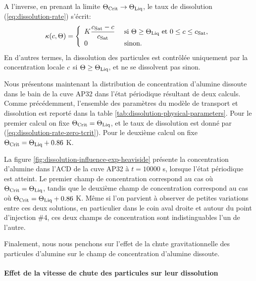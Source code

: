 A l'inverse, en prenant la limite $\Theta_\text{Crit} \to  \Theta_\text{Liq}$, le taux de
dissolution (\ref{eq:dissolution-rate}) s'écrit:
\begin{equation}\label{eq:dissolution-rate-zero-tcrit}
  \kappa(c,\Theta) = \left\{
  \begin{array}{ll}
  K \displaystyle\frac{c_\text{Sat} - c}{c_\text{Sat}}& \text{ si } \Theta
  \geq \Theta_\text{Liq}\text{ et } 0\leq c \leq c_\text{Sat},\\
  0 &  \text{ sinon.}
  \end{array}
  \right.
\end{equation}
En d'autres termes, la dissolution des particules est contrôlée
uniquement par la concentration locale $c$ si
$\Theta \geq \Theta_\text{Liq}$, et ne se dissolvent pas sinon.

Nous présentons maintenant la distribution de concentration d'alumine
dissoute dans le bain de la cuve AP32 dans l'état périodique résultant
de deux calculs. Comme précédemment, l'ensemble des paramètres du
modèle de transport et dissolution est reporté dans la table
\ref{tab:dissolution-physical-parameters}. Pour le premier calcul on
fixe $\Theta_\text{Crit} = \Theta_\text{Liq}$, et le taux de dissolution est donné par
(\ref{eq:dissolution-rate-zero-tcrit}). Pour le deuxième calcul on
fixe $\Theta_\text{Crit} = \Theta_\text{Liq} + 0.86$ \si{\kelvin}.

La figure \ref{fig:dissolution-influence-exp-heaviside} présente la
concentration d'alumine dans l'ACD de la cuve AP32 à $t = \num{10000}$
\si{\second}, lorsque l'état périodique est atteint. Le premier champ
de concentration correspond au cas où $\Theta_\text{Crit} = \Theta_\text{Liq}$, tandis que le
deuxième champ de concentration correspond au cas où $\Theta_\text{Crit} = \Theta_\text{Liq} +
0.86$ \si{\kelvin}. Même si l'on parvient à observer de petites
variations entre ces deux solutions, en particulier dans le coin aval
droite et autour du point d'injection \#4, ces deux champs de
concentration sont indistinguables l'un de l'autre.

Finalement, nous nous penchons sur l'effet de la chute
gravitationnelle des particules d'alumine sur le champ de
concentration d'alumine dissoute.

\paragraph{Effet de la vitesse de chute des particules sur leur
  dissolution}


